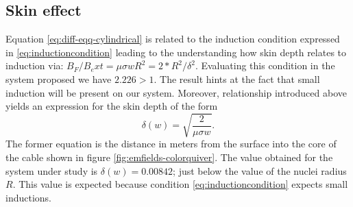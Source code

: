 \subsection{Skin effect}
Equation \ref{eq:diff-eqq-cylindrical} is related to the induction condition expressed in \ref{eq:inductioncondition} leading to the understanding how skin depth relates to induction via: $B_F/B_ext = \mu \sigma w R^2 = 2*R^2 / \delta^2$. Evaluating this condition in the system proposed we have $2.226 > 1$. The result hints at the fact that small induction will be present on our system. Moreover, relationship introduced above yields an expression for the skin depth of the form
\begin{equation}
    \delta(w) = \sqrt{\frac{2 }{\mu \sigma w}}.
\end{equation}
The former equation is the distance in meters from the surface into the core of the cable shown in figure \ref{fig:emfields-colorquiver}. The value obtained for the system under study is $\delta(w) = 0.00842$; just below the value of the nuclei radius $R$. This value is expected because condition \ref{eq:inductioncondition} expects small inductions.

